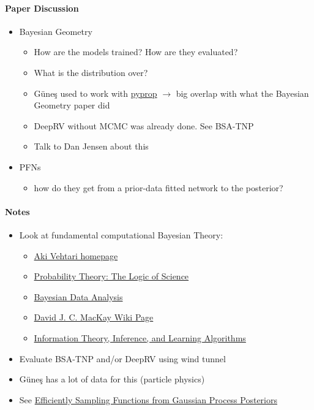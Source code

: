 \documentclass[12pt,a4paper,twoside]{article}
\begin{document}
\begin{meetingsummary}
	\paragraph{Paper Discussion}
	\begin{itemize}
		\item Bayesian Geometry
		\begin{itemize}
			\item How are the models trained? How are they evaluated?
			\item What is the distribution over?
			\item G\" une\c s used to work with \href{https://pyprop.readthedocs.io/en/latest/introduction.html}{pyprop} $\rightarrow$ big overlap with what the Bayesian Geometry paper did
			\item DeepRV without MCMC was already done. See BSA-TNP~\cite{Jenson2025}
			\item Talk to Dan Jensen about this
		\end{itemize}
		\item PFNs
		\begin{itemize}
			\item how do they get from a prior-data fitted network to the posterior?
		\end{itemize}
	\end{itemize}

	\paragraph{Notes}
	\begin{itemize}
		\item Look at fundamental computational Bayesian Theory:
		      \begin{itemize}
				\item \href{https://users.aalto.fi/~ave/}{Aki Vehtari homepage}
				\item \href{https://bayes.wustl.edu/etj/prob/book.pdf}{Probability Theory: The Logic of Science}
				\item \href{https://sites.stat.columbia.edu/gelman/book/}{Bayesian Data Analysis}
				\item \href{https://en.wikipedia.org/wiki/David_J._C._MacKay}{David J. C. MacKay Wiki Page}
				\item \href{https://www.inference.org.uk/itprnn/book.pdf}{Information Theory, Inference, and Learning Algorithms}
		      \end{itemize}
		\item Evaluate BSA-TNP and/or DeepRV using wind tunnel
		\item[$\rightarrow$] G\" une\c s has a lot of data for this (particle physics) 
		\item[$\rightarrow$] See \href{https://arxiv.org/abs/2002.09309}{Efficiently Sampling Functions from Gaussian Process Posteriors}
	\end{itemize}

	
\end{meetingsummary}
\end{document}
